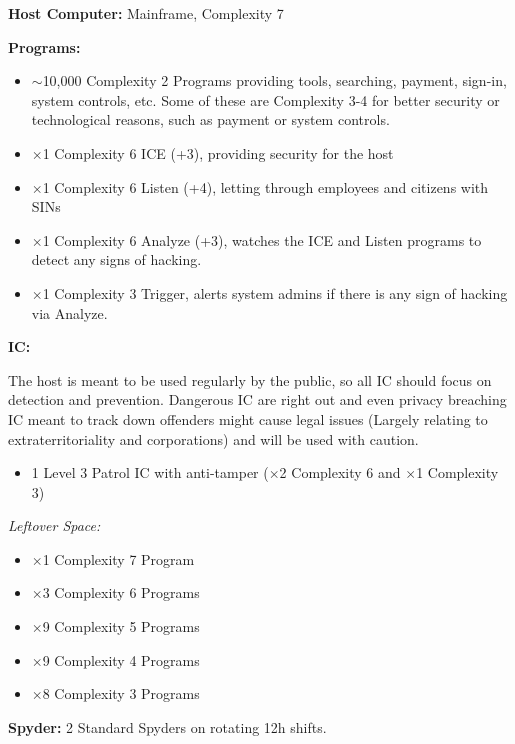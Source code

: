 \begin{multicols}{2}
	\hspace{\parindent}\textbf{Host Computer:} Mainframe, Complexity 7
	
	\textbf{Programs:}
	
	\begin{itemize}
		\itemsep 0pt
		\item $\sim$10,000 Complexity 2 Programs providing tools, searching, payment, sign-in, system controls, etc. Some of these are Complexity 3-4 for better security or technological reasons, such as payment or system controls.
		\item $\times$1 Complexity 6 ICE (+3), providing security for the host
		\item $\times$1 Complexity 6 Listen (+4), letting through employees and citizens with SINs
		\item $\times$1 Complexity 6 Analyze (+3), watches the ICE and Listen programs to detect any signs of hacking.
		\item $\times$1 Complexity 3 Trigger, alerts system admins if there is any sign of hacking via Analyze.
	\end{itemize}

	\textbf{IC:}
	
	The host is meant to be used regularly by the public, so all IC should focus on detection and prevention. Dangerous IC are right out and even privacy breaching IC meant to track down offenders might cause legal issues (Largely relating to extraterritoriality and corporations) and will be used with caution.
	
	\begin{itemize}
		\itemsep 0pt
		\item 1 Level 3 Patrol IC with anti-tamper ($\times$2 Complexity 6 and $\times$1 Complexity 3)
	\end{itemize}
	
	
	\textit{Leftover Space:}
	\begin{itemize}
		\itemsep 0pt
		\item $\times$1 Complexity 7 Program
		\item $\times$3 Complexity 6 Programs
		\item $\times$9 Complexity 5 Programs
		\item $\times$9 Complexity 4 Programs
		\item $\times$8 Complexity 3 Programs
	\end{itemize}
	
	\textbf{Spyder:}
	2 Standard Spyders on rotating 12h shifts.
	

\end{multicols}

